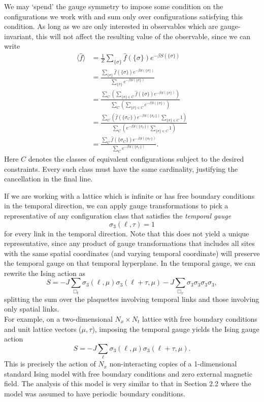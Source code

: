 \documentclass[11pt,reqno]{amsart}
\begin{document}
	We may `spend' the gauge symmetry to impose some condition on the configurations we work with and sum only over configurations satisfying this condition.
	As long as we are only interested in observables which are gauge-invariant, this will not affect the resulting value of the observable, since we can write
	\begin{align*}
		\langle \hat{f} \rangle &= \frac{1}{Z}\sum_{\{\sigma\}} \hat{f} (\{\sigma\}) e^{-\beta S(\{\sigma\})} \\
			&= \frac{\sum_{\{\sigma\}} \hat{f} (\{\sigma\}) e^{-\beta S(\{\sigma\})}}{\sum_{\{\sigma\}} e^{-\beta S(\{\sigma\})}}\\
			&= \frac{\sum_{C} \left(\sum_{\{\sigma\}\in C} \hat{f} (\{\sigma\}) e^{-\beta S(\{\sigma\})}\right)}{\sum_{C} \left(\sum_{\{\sigma\}\in C} e^{-\beta S(\{\sigma\})}\right)}\\
			&=\frac{\sum_{C} \left( \hat{f} (\{\sigma_C\}) e^{-\beta S(\{\sigma_C\})}\sum_{\{\sigma\}\in C} 1 \right)}{\sum_{C} \left( e^{-\beta S(\{\sigma_C\})}\sum_{\{\sigma\}\in C} 1\right)} \\
			&=\frac{\sum_{C} \hat{f} (\{\sigma_C\}) e^{-\beta S(\{\sigma_C\})}}{\sum_{C} e^{-\beta S(\{\sigma_C\})}}.
	\end{align*}
	Here $C$ denotes the classes of equivalent configurations subject to the desired constraints.
	Every such class must have the same cardinality, justifying the cancellation in the final line.
	
	If we are working with a lattice which is infinite or has free boundary conditions in the temporal direction, we can apply gauge transformations to pick a representative of any configuration class that satisfies the \emph{temporal gauge}
		\[ \sigma_3(\ell, \tau) =1 \]
	for every link in the temporal direction.	
	Note that this does not yield a unique representative, since any product of gauge transformations that includes all sites with the same spatial coordinates (and varying temporal coordinate) will preserve the temporal gauge on that temporal hyperplane.
	In the temporal gauge, we can rewrite the Ising action as
		\[S = -J\sum_{\Box_t} \sigma_3(\ell,\mu)\sigma_3(\ell+\tau,\mu) -J\sum_{\Box_x} \sigma_3\sigma_3\sigma_3\sigma_3,\]
	splitting the sum over the plaquettes involving temporal links and those involving only spatial links.\\
		
	For example, on a two-dimensional $N_x\times N_t$ lattice with free boundary conditions and unit lattice vectors ($\mu,\tau$), imposing the temporal gauge yields the Ising gauge action
		\[ S=-J\sum_{\ell} \sigma_3(\ell,\mu)\sigma_3(\ell+\tau,\mu). \]
	This is precisely the action of $N_x$ non-interacting copies of a 1-dimensional standard Ising model with free boundary conditions and zero external magnetic field.
	The analysis of this model is very similar to that in Section 2.2 where the model was assumed to have periodic boundary conditions.
	
\end{document}
